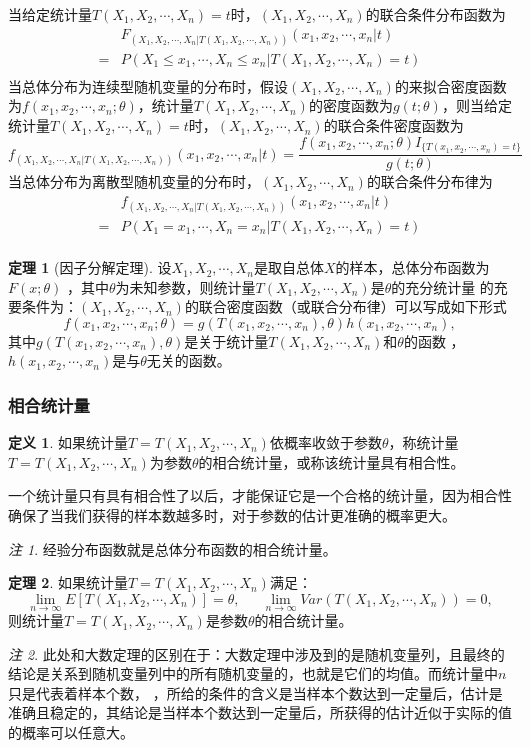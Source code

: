 \documentclass[a4paper,11pt]{article}%
\theoremstyle{remark}
\newtheorem*{remark}{注}
\theoremstyle{remark}
\theoremstyle{definition}
\newtheorem{theorem}{定理}[section]
\theoremstyle{definition}
\newtheorem*{definition}{定义}
\theoremstyle{plain}
\begin{document}
当给定统计量$T(X_1,X_2,\cdots,X_n)=t$时，$(X_1,X_2,\cdots,X_n)$的联合条件分布函数为
\[
\begin{array}{cl}
&F_{(X_1,X_2,\cdots,X_n|T(X_1,X_2,\cdots,X_n))}(x_1,x_2,\cdots,x_n|t)\\
=&P(X_1\leq x_1,\cdots,X_n\leq x_n|T(X_1,X_2,\cdots,X_n)=t)\\
\end{array}
\]
当总体分布为连续型随机变量的分布时，假设$(X_1,X_2,\cdots,X_n)$的来拟合密度函数为$f(x_1,x_2,\cdots,x_n;\theta)$，统计量$T(X_1,X_2,\cdots,X_n)$的密度函数为$g(t;\theta)$，则当给定统计量$T(X_1,X_2,\cdots,X_n)=t$时，$(X_1,X_2,\cdots,X_n)$的联合条件密度函数为
\[f_{(X_1,X_2,\cdots,X_n|T(X_1,X_2,\cdots,X_n))}(x_1,x_2,\cdots,x_n|t)=\frac{f(x_1,x_2,\cdots,x_n;\theta)I_{\{T(x_1,x_2,\cdots,x_n)=t\}}}{g(t;\theta)}\]
当总体分布为离散型随机变量的分布时，$(X_1,X_2,\cdots,X_n)$的联合条件分布律为
\[
\begin{array}{cl}
&f_{(X_1,X_2,\cdots,X_n|T(X_1,X_2,\cdots,X_n))}(x_1,x_2,\cdots,x_n|t)\\
=&P(X_1= x_1,\cdots,X_n= x_n|T(X_1,X_2,\cdots,X_n)=t)\\
\end{array}
\]
\begin{theorem}[因子分解定理]
    设$X_1,X_2,\cdots,X_n$是取自总体$X$的样本，总体分布函数为$F(x;\theta)$ ，其中$\theta$为未知参数，则统计量$T(X_1,X_2,\cdots,X_n)$是$\theta$的充分统计量
    的充要条件为：$(X_1,X_2,\cdots,X_n)$的联合密度函数（或联合分布律）可以写成如下形式
    \[f(x_1,x_2,\cdots,x_n;\theta)=g(T(x_1,x_2,\cdots,x_n),\theta)h(x_1,x_2,\cdots,x_n),\]
    其中$g(T(x_1,x_2,\cdots,x_n),\theta)$是关于统计量$T(X_1,X_2,\cdots,X_n)$和$\theta$的函数 ，\\$h(x_1,x_2,\cdots,x_n)$是与$\theta$无关的函数。
\end{theorem}
\subsubsection{相合统计量}
\begin{definition}
    如果统计量$T=T(X_1,X_2,\cdots,X_n)$依概率收敛于参数$\theta$，称统计量$T=T(X_1,X_2,\cdots,X_n)$为参数$\theta$的相合统计量，或称该统计量具有相合性。
\end{definition}
一个统计量只有具有相合性了以后，才能保证它是一个合格的统计量，因为相合性确保了当我们获得的样本数越多时，对于参数的估计更准确的概率更大。
\begin{remark}
    经验分布函数就是总体分布函数的相合统计量。
\end{remark}
\begin{theorem}
    如果统计量$T=T(X_1,X_2,\cdots,X_n)$满足：
    \[\lim_{n\rightarrow\infty}E[T(X_1,X_2,\cdots,X_n)]=\theta,\phantom{111}\lim_{n\rightarrow \infty}Var(T(X_1,X_2,\cdots,X_n))=0,\]
    则统计量$T=T(X_1,X_2,\cdots,X_n)$是参数$\theta$的相合统计量。
\end{theorem}
\begin{remark}
    此处和大数定理的区别在于：大数定理中涉及到的是随机变量列，且最终的结论是关系到随机变量列中的所有随机变量的，也就是它们的均值。而统计量中$n$只是代表着样本个数，
    ，所给的条件的含义是当样本个数达到一定量后，估计是准确且稳定的，其结论是当样本个数达到一定量后，所获得的估计近似于实际的值的概率可以任意大。
\end{remark}
\end{document}
